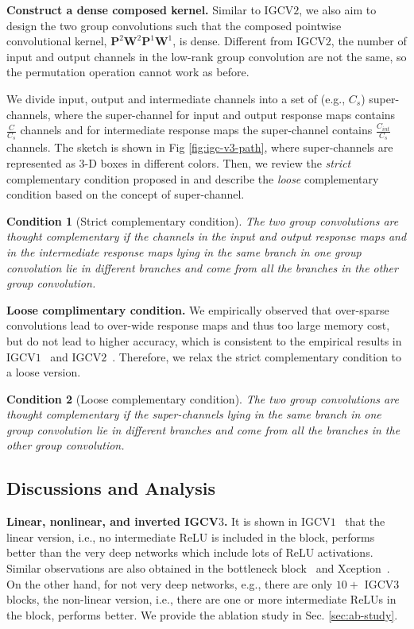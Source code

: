 \documentclass{bmvc2k}
\begin{document}
	\noindent\textbf{Construct a dense composed kernel.}
	Similar to IGCV$2$, we also aim to design the two group convolutions such that
	the composed pointwise convolutional kernel, $\mathbf{P}^2\mathbf{W}^2\mathbf{P}^1\mathbf{W}^1$, is dense. Different from IGCV$2$, the number of input and output channels in the low-rank group convolution are not the same, so the permutation operation cannot work as before.

	We divide input, output and intermediate channels into a set of (e.g., $C_s$) super-channels, where the super-channel for input and output response maps contains $\frac{C}{C_s}$ channels and for intermediate response maps the super-channel contains $\frac{C_{int}}{C_s}$ channels.
	The sketch is shown in Fig \ref{fig:igc-v3-path}, where super-channels are represented as 3-D boxes in different colors.
	Then, we review the \emph{strict} complementary condition proposed in \cite{ISSC18} and describe the \emph{loose} complementary condition based on the concept of super-channel.

	\newtheorem{condition}{Condition}

	\begin{condition}[Strict complementary condition]
		The two group convolutions are thought complementary
		if
		the channels in the input and output response maps and
		in the intermediate response maps
		lying in the same branch
		in one group convolution
		lie in different branches
		and come from all the branches in the other group convolution.
	\end{condition}

	\noindent\textbf{Loose complimentary condition.}
	We empirically observed that
	over-sparse convolutions lead to over-wide response maps
	and thus too large memory cost,
	but do not lead to higher accuracy,
	which is consistent to the empirical results in IGCV$1$~\cite{zhang2017interleaved} and IGCV$2$~\cite{ISSC18}.
	Therefore,
	we relax the strict complementary condition
	to a loose version.
	\begin{condition}[Loose complementary condition]
		The two group convolutions are thought complementary
		if
		the super-channels lying in the same branch
		in one group convolution
		lie in different branches
		and come from all the branches in the other group convolution.
	\end{condition}

	\subsection{Discussions and Analysis}
	\noindent\textbf{Linear, nonlinear, and inverted IGCV$3$.}
	It is shown in IGCV$1$~\cite{zhang2017interleaved}
	that the linear version,
	i.e., no intermediate ReLU is included in the block,
	performs better than the very deep networks
	which include lots of ReLU activations.
	Similar observations are also obtained
	in the bottleneck block~\cite{he2016deep} and Xception~\cite{Chollet16a}.
	On the other hand, for not very deep networks,
	e.g., there are only $10+$ IGCV$3$ blocks,
	the non-linear version, i.e.,
	there are one or more intermediate ReLUs in the block,
	performs better.
	We provide the ablation study in Sec. \ref{sec:ab-study}.
\end{document}
